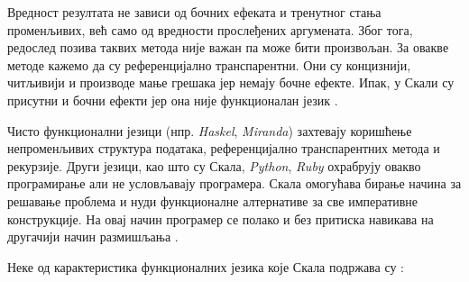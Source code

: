 \documentclass[12pt,oneside]{memoir}
\begin{document}
Вредност резултата не зависи од бочних ефеката и тренутног стања променљивих, већ само од вредности прослеђених аргумената. Због тога, редослед позива таквих метода није важан па може бити произвољан. За овакве методе кажемо да су референцијално транспарентни. Они су концизнији, читљивији и производе мање грешака јер немају бочне ефекте. Ипак, у Скали су присутни и бочни ефекти јер она није функционалан језик \cite{funkMilena}.
\par Чисто функционални језици (нпр. \textit{Haskel}, \textit{Miranda}) захтевају коришћење непроменљивих структура података, референцијално транспарентних метода и рекурзије. Други језици, као што су Скала, \textit{Python}, \textit{Ruby} охрабрују овакво програмирање али не условљавају програмера. Скала омогућава бирање начина за решавање проблема и нуди функционалне алтернативе за све императивне конструкције. На овај начин програмер се полако и без притиска навикава на другачији начин размишљања \cite{funkMilena, progInScala}.
\par Неке од карактеристика функционалних језика које Скала подржава су \cite{progInScala}:
\end{document}

